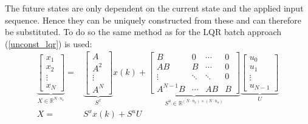 The future states are only dependent on the current state and the applied input sequence. Hence they can be uniquely constructed from these and can therefore be substituted. To do so the same method as for the LQR batch approach (\ref{unconst_lqr}) is used:
\begin{align*}
    \underbrace{\begin{bmatrix}
                        x_1    \\
                        x_2    \\
                        \vdots \\
                        x_N
                    \end{bmatrix}}_{X \in \mathbb{R}^{N\cdot n_x}} = &
    \underbrace{\begin{bmatrix}
                        A      \\
                        A^2    \\
                        \vdots \\
                        A^N
                    \end{bmatrix}}_{S^x} x(k) +
    \underbrace{\begin{bmatrix}
                        B        & 0      & \cdots & 0 \\
                        AB       & B      & \cdots & 0 \\
                        \vdots   & \ddots & \ddots & 0 \\
                        A^{N-1}B & \cdots & AB     & B
                    \end{bmatrix}}_{S^u \in \mathbb{R}^{(N\cdot n_x)\times (N\cdot n_u)}}
    \underbrace{\begin{bmatrix}
                        u_0    \\
                        u_1    \\
                        \vdots \\
                        u_{N-1}
                    \end{bmatrix}}_{U}                                      \\
    X =                                              & S^x x(k) + S^u U
\end{align*}

\newpar{}

